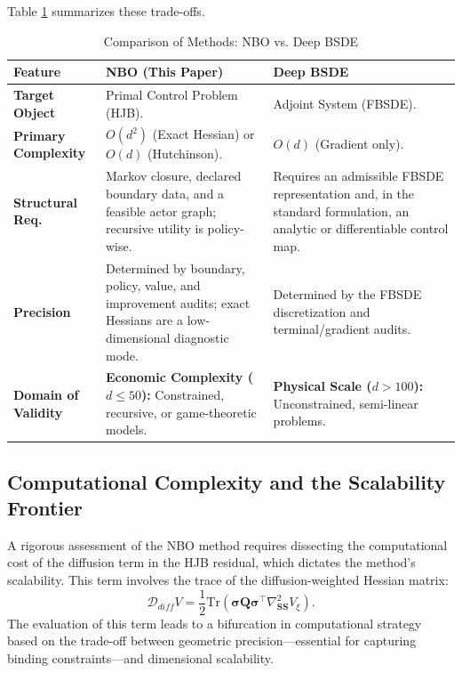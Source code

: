 \documentclass[ecta]{econsocart}
\theoremstyle{plain}
\theoremstyle{remark}
\newcommand{\statevec}{\bm{S}}
\newcommand{\diffvec}{\bm{\sigma}}
\begin{document}
Table \ref{tab:nbo_vs_bsde} summarizes these trade-offs.

\begin{table}[H]
\centering
\caption{Comparison of Methods: NBO vs. Deep BSDE}
\label{tab:nbo_vs_bsde}
\begin{tabularx}{\textwidth}{@{}lXX@{}}
\toprule
\textbf{Feature} & \textbf{NBO (This Paper)} & \textbf{Deep BSDE \cite{han2018solving}} \\
\midrule
\textbf{Target Object} & Primal Control Problem (HJB). & Adjoint System (FBSDE). \\
\midrule
\textbf{Primary Complexity} & \textbf{$O(d^2)$} (Exact Hessian) or \textbf{$O(d)$} (Hutchinson). & \textbf{$O(d)$} (Gradient only). \\
\midrule
\textbf{Structural Req.} & Markov closure, declared boundary data, and a feasible actor graph; recursive utility is policy-wise. & Requires an admissible FBSDE representation and, in the standard formulation, an analytic or differentiable control map. \\
\midrule
\textbf{Precision} & Determined by boundary, policy, value, and improvement audits; exact Hessians are a low-dimensional diagnostic mode. & Determined by the FBSDE discretization and terminal/gradient audits. \\
\midrule
\textbf{Domain of Validity} & \textbf{Economic Complexity ($d \le 50$):} Constrained, recursive, or game-theoretic models. & \textbf{Physical Scale ($d > 100$):} Unconstrained, semi-linear problems. \\
\bottomrule
\end{tabularx}
\end{table}


\subsection{Computational Complexity and the Scalability Frontier}
\label{sec:computational_cost}

A rigorous assessment of the NBO method requires dissecting the computational cost of the diffusion term in the HJB residual, which dictates the method's scalability. This term involves the trace of the diffusion-weighted Hessian matrix:
\begin{equation}
\label{eq:diff_term}
\mathcal{D}_{diff} V = \frac{1}{2}\text{Tr}\left(\diffvec \bm{Q} \diffvec^\top \nabla_{\statevec\statevec}^2 V_\xi\right).
\end{equation}
The evaluation of this term leads to a bifurcation in computational strategy based on the trade-off between geometric precision—essential for capturing binding constraints—and dimensional scalability.
\end{document}
